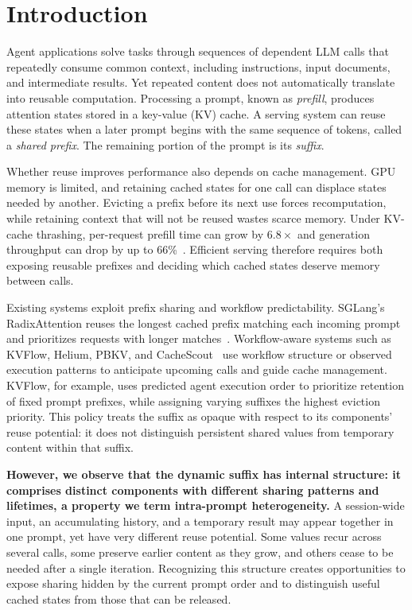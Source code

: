 \section{Introduction}
\label{sec:intro}

Agent applications solve tasks through sequences of dependent LLM calls that repeatedly consume common context, including instructions, input documents, and intermediate results. Yet repeated content does not automatically translate into reusable computation. Processing a prompt, known as \emph{prefill}, produces attention states stored in a key-value (KV) cache. A serving system can reuse these states when a later prompt begins with the same sequence of tokens, called a \emph{shared prefix}. The remaining portion of the prompt is its \emph{suffix}.

Whether reuse improves performance also depends on cache management. GPU memory is limited, and retaining cached states for one call can displace states needed by another. Evicting a prefix before its next use forces recomputation, while retaining context that will not be reused wastes scarce memory. Under KV-cache thrashing, per-request prefill time can grow by $6.8\times$ and generation throughput can drop by up to 66\%~\cite{yuan2026agentic}. Efficient serving therefore requires both exposing reusable prefixes and deciding which cached states deserve memory between calls.

Existing systems exploit prefix sharing and workflow predictability. SGLang's RadixAttention reuses the longest cached prefix matching each incoming prompt and prioritizes requests with longer matches~\cite{zheng2024sglang}. Workflow-aware systems such as KVFlow, Helium, PBKV, and CacheScout~\cite{pan2025kvflow,wadlom2026helium,zheng2026pbkv,zhang2026cachescout} use workflow structure or observed execution patterns to anticipate upcoming calls and guide cache management. KVFlow, for example, uses predicted agent execution order to prioritize retention of fixed prompt prefixes, while assigning varying suffixes the highest eviction priority. This policy treats the suffix as opaque with respect to its components' reuse potential: it does not distinguish persistent shared values from temporary content within that suffix.

\textbf{However, we observe that the dynamic suffix has internal structure: it comprises distinct components with different sharing patterns and lifetimes, a property we term intra-prompt heterogeneity.} A session-wide input, an accumulating history, and a temporary result may appear together in one prompt, yet have very different reuse potential. Some values recur across several calls, some preserve earlier content as they grow, and others cease to be needed after a single iteration. Recognizing this structure creates opportunities to expose sharing hidden by the current prompt order and to distinguish useful cached states from those that can be released.

